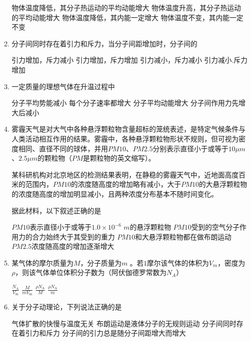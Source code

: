 \begin{enumerate}[leftmargin=0em]
\fourchoices
{物体温度降低，其分子热运动的平均动能增大}
{物体温度升高，其分子热运动的平均动能增大}
{物体温度降低，其内能一定增大}
{物体温度不变，其内能一定不变}


\item
{}
分子间同时存在着引力和斥力，当分子间距增加时，分子间的  


\fourchoices
{引力增加，斥力减小}
{引力增加，斥力增加}
{引力减小，斥力减小}
{引力减小.斥力增加}

\item
{}
一定质量的理想气体在升温过程中  


\fourchoices
{分子平均势能减小}
{每个分子速率都增大}
{分子平均动能增大}
{分子间作用力先增大后减小}




\item
{}
雾霾天气是对大气中各种悬浮颗粒物含量超标的笼统表述，是特定气候条件与人类活动相互作用的结果。雾霾中，各种悬浮颗粒物形状不规则，但可视为密度相同、直径不同的球体，并用$ PM10 $、$ PM2.5 $分别表示直径小于或等于$ 10 \mu m $、$ 2.5 \mu m $的颗粒物（$ PM $是颗粒物的英文缩写）。

某科研机构对北京地区的检测结果表明，在静稳的雾霾天气中，近地面高度百米的范围内，$ PM10 $的浓度随高度的增加略有减小，大于$ PM10 $的大悬浮颗粒物的浓度随高度的增加明显减小，且两种浓度分布基本不随时间变化。

据此材料，以下叙述正确的是  


\fourchoices
{$ PM10 $表示直径小于或等于$ 1.0 \times 10^{-6} $ $ m $的悬浮颗粒物}
{$ PM10 $受到的空气分子作用力的合力始终大于其受到的重力}
{$ PM10 $和大悬浮颗粒物都在做布朗运动}
{$ PM2.5 $浓度随高度的增加逐渐增大}


\item
{}
某气体的摩尔质量为$ M $，分子质量为$ m $ 。若$ 1 $摩尔该气体的体积为$ V_m $，密度为$ \rho $，则该气体单位体积分子数为（阿伏伽德罗常数为$ N_A $）  


\fourchoices
{$ \frac { N _ { \mathrm { A } } } { V _ { \mathrm { m } } } $}
{$ \frac { M } { m V _ { \mathrm { m } } } $}
{$ \frac { \rho N _ { \mathrm { A } } } { M } $}
{$ \frac { \rho N _ { \mathrm { A } } } { m } $}




\item
{}
关于分子动理论，下列说法正确的是  


\fourchoices
{气体扩散的快慢与温度无关}
{布朗运动是液体分子的无规则运动}
{分子间同时存在着引力和斥力}
{分子间的引力总是随分子间距增大而增大}



\end{enumerate}
